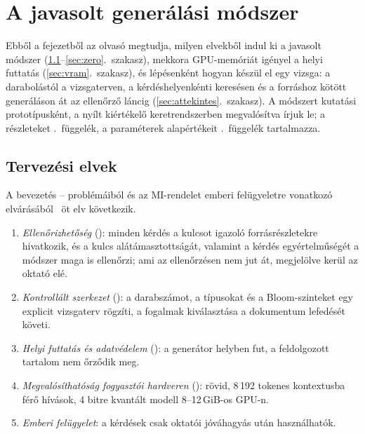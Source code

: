 \chapter{A javasolt generálási módszer}
\label{ch:modszer}

Ebből a fejezetből az olvasó megtudja, milyen elvekből indul ki a javasolt módszer
(\ref{sec:architektura}--\ref{sec:zero}.~szakasz), mekkora GPU-memóriát igényel a helyi futtatás
(\ref{sec:vram}.~szakasz), és lépésenként hogyan készül el egy vizsga: a darabolástól a vizsgaterven, a
kérdéshelyenkénti keresésen és a forráshoz kötött generáláson át az ellenőrző láncig
(\ref{sec:attekintes}.~szakasz). A módszert kutatási prototípusként, a nyílt kiértékelő keretrendszerben
megvalósítva írjuk le; a részleteket
\az{\ref{app-modszer}}.~függelék, a paraméterek alapértékeit \az{\ref{app-reprodukcio}}.~függelék
tartalmazza.

\section{Tervezési elvek}
\label{sec:architektura}

A bevezetés -- problémáiból és az MI-rendelet emberi felügyeletre vonatkozó elvárásából~\cite{aiact2024}
öt elv következik.
\begin{enumerate}[label=(\arabic*),leftmargin=*,itemsep=1pt]
\item \emph{Ellenőrizhetőség} (): minden kérdés a kulcsot igazoló forrásrészletekre hivatkozik, és a
kulcs alátámasztottságát, valamint a kérdés egyértelműségét a módszer maga is ellenőrzi; ami az
ellenőrzésen nem jut át, megjelölve kerül az oktató elé.
\item \emph{Kontrollált szerkezet} (): a darabszámot, a típusokat és a Bloom-szinteket egy explicit
vizsgaterv rögzíti, a fogalmak kiválasztása a dokumentum lefedését követi.
\item \emph{Helyi futtatás és adatvédelem} (): a generátor helyben fut, a feldolgozott tartalom nem
őrződik meg.
\item \emph{Megvalósíthatóság fogyasztói hardveren} (): rövid, 8\,192 tokenes kontextusba férő hívások,
4 bitre kvantált modell 8--12\,GiB-os GPU-n.
\item \emph{Emberi felügyelet}: a kérdések csak oktatói jóváhagyás után használhatók.
\end{enumerate}

